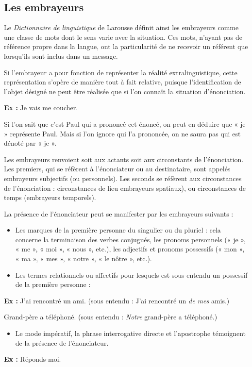 \subsection{Les embrayeurs}
Le \textit{Dictionnaire de linguistique} de Larousse définit ainsi les embrayeurs comme une classe de mots dont le sens varie avec la situation. Ces mots, n’ayant pas de référence propre dans la langue, ont la particularité de ne recevoir un référent que lorsqu’ils sont inclus dans un message.

Si l’embrayeur a pour fonction de représenter la réalité extralinguistique, cette représentation s’opère de manière tout à fait relative, puisque l’identification de l’objet désigné ne peut être réalisée que si l’on connaît la situation d’énonciation.

\textbf{Ex :} Je vais me coucher.

Si l’on sait que c’est Paul qui a prononcé cet énoncé, on peut en déduire que « je » représente Paul. Mais si l’on ignore qui l’a prononcée, on ne saura pas qui est dénoté par « je ».

Les embrayeurs renvoient soit aux actants soit aux circonstants de l’énonciation. Les premiers, qui se réfèrent à l’énonciateur ou au destinataire, sont appelés embrayeurs subjectifs (ou personnels). Les seconds se réfèrent aux circonstances de l’énonciation : circonstances de lieu embrayeurs spatiaux), ou circonstances de temps (embrayeurs temporels).

La présence de l’énonciateur peut se manifester par les embrayeurs suivants :
\begin{itemize}
\item Les marques de la première personne du singulier ou du pluriel : cela concerne la terminaison des verbes conjugués, les pronoms personnels (« je », « me », « moi », « nous », etc.), les adjectifs et pronoms possessifs (« mon », « ma », « mes », « notre », « le nôtre », etc.).
\item Les termes relationnels ou affectifs pour lesquels est sous-entendu un possessif de la première personne :
\end{itemize}
\textbf{Ex :} J’ai rencontré un ami. (sous entendu : J’ai rencontré un \textit{de mes} amis.)

\hspace*{1.5em}Grand-père a téléphoné. (sous entendu : \textit{Notre} grand-père a téléphoné.)
\begin{itemize}
\item Le mode impératif, la phrase interrogative directe et l’apostrophe témoignent de la présence de l’énonciateur.
\end{itemize}
\textbf{Ex :} Réponds-moi.


